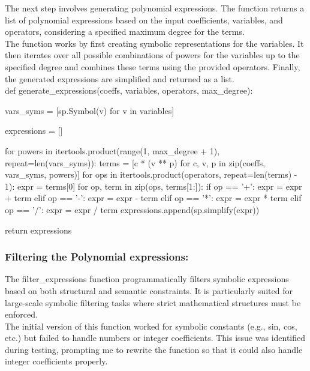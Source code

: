 \documentclass{article}
\begin{document}
The next step involves generating polynomial expressions. The function returns a list of polynomial expressions based on the input coefficients, variables, and operators, considering a specified maximum degree for the terms.\\

The function works by first creating symbolic representations for the variables. It then iterates over all possible combinations of powers for the variables up to the specified degree and combines these terms using the provided operators. Finally, the generated expressions are simplified and returned as a list.\\


def generate_expressions(coeffs, variables, operators, max_degree):

    vars_syms = [sp.Symbol(v) for v in variables]

    expressions = []


    for powers in itertools.product(range(1, max_degree + 1), repeat=len(vars_syms)):
        terms = [c * (v ** p) for c, v, p in zip(coeffs, vars_syms, powers)]
        for ops in itertools.product(operators, repeat=len(terms) - 1):
            expr = terms[0]
            for op, term in zip(ops, terms[1:]):
                if op == '+':
                    expr = expr + term
                elif op == '-':
                    expr = expr - term
                elif op == '*':
                    expr = expr * term
                elif op == '/':
                    expr = expr / term
            expressions.append(sp.simplify(expr))

    return expressions




\subsubsection{Filtering the Polynomial expressions:}

The filter_expressions function programmatically filters symbolic expressions based on both structural and semantic constraints. It is particularly suited for large-scale symbolic filtering tasks where strict mathematical structures must be enforced.\\

The initial version of this function worked for symbolic constants (e.g., sin, cos, etc.) but failed to handle numbers or integer coefficients. This issue was identified during testing, prompting me to rewrite the function so that it could also handle integer coefficients properly.\\
\end{document}
